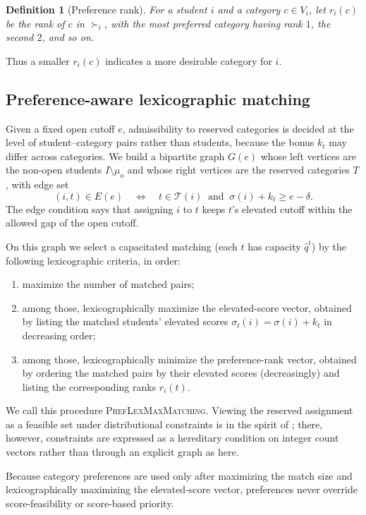 \documentclass[10pt]{article}
\newtheorem{definition}{Definition}
\newcommand{\T}{\mathcal{T}}
\newcommand{\1}{\mathbf{1}}
\begin{document}
\begin{definition}[Preference rank]
For a student $i$ and a category $c\in V_i$, let $r_i(c)$ be the rank of $c$ in $\succ_i$, with the most preferred category having rank $1$, the second $2$, and so on.
\end{definition}

Thus a smaller $r_i(c)$ indicates a more desirable category for $i$.

\subsection{Preference-aware lexicographic matching}

Given a fixed open cutoff $e$, admissibility to reserved categories is decided at the level of student--category pairs rather than students, because the bonus $k_t$ may differ across categories. We build a bipartite graph $G(e)$ whose left vertices are the non-open students $I\setminus\mu_o$ and whose right vertices are the reserved categories $T$, with edge set
\[
(i,t)\in E(e)
\quad\Longleftrightarrow\quad
t\in\T(i)
\ \text{ and }\
\sigma(i)+k_t\ge e-\delta.
\]
The edge condition says that assigning $i$ to $t$ keeps $t$'s elevated cutoff within the allowed gap of the open cutoff.

On this graph we select a capacitated matching (each $t$ has capacity $\hat q^t$) by the following lexicographic criteria, in order:
\begin{enumerate}
\item maximize the number of matched pairs;
\item among those, lexicographically maximize the elevated-score vector, obtained by listing the matched students' elevated scores $\sigma_t(i)=\sigma(i)+k_t$ in decreasing order;
\item among those, lexicographically minimize the preference-rank vector, obtained by ordering the matched pairs by their elevated scores (decreasingly) and listing the corresponding ranks $r_i(t)$.
\end{enumerate}
We call this procedure \textsc{PrefLexMaxMatching}. Viewing the reserved assignment as a feasible set under distributional constraints is in the spirit of \citet{GKK+17a}; there, however, constraints are expressed as a hereditary condition on integer count vectors rather than through an explicit graph as here.

Because category preferences are used only after maximizing the match size and lexicographically maximizing the elevated-score vector, preferences never override score-feasibility or score-based priority.
\end{document}
